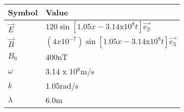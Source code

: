 \setlength{\arrayrulewidth}{0.3mm}
\setlength{\tabcolsep}{15pt}
\renewcommand{\arraystretch}{1.5}

\begin{center}
\begin{tabular}{ |p{0.6cm}|p{4.40cm}|  }


\hline
Symbol&Value\\
\hline
$\vec{E}$ & $120\sin[1.05x - 3.14 \text{x} 10^8t]\vec{e_2}$\\
\hline
$\vec{B}$ & $(4 x 10^{-7})\sin[1.05x - 3.14 \text{x} 10^8t]\vec{e_3}$\\
\hline
$B_0$  & 400nT\\
\hline
$\omega$ &  3.14 x 10$^8$m/s\\
\hline
$k$  & 1.05rad/s\\
\hline
$\lambda$ & 6.0m\\

\hline
\end{tabular}
\end{center}